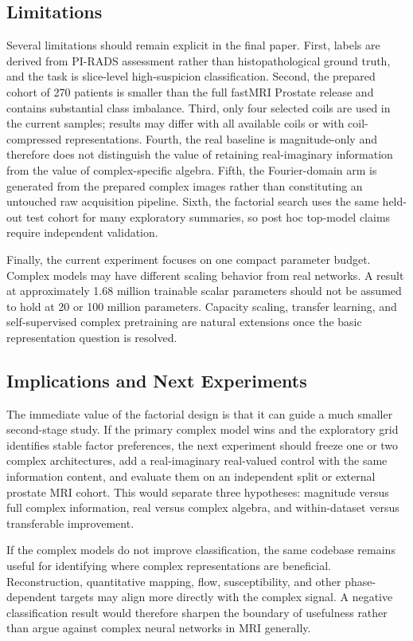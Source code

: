 \documentclass[journal]{IEEEtran}
\begin{document}
\subsection{Limitations}
Several limitations should remain explicit in the final paper. First, labels are derived from PI-RADS assessment rather than histopathological ground truth, and the task is slice-level high-suspicion classification. Second, the prepared cohort of 270 patients is smaller than the full fastMRI Prostate release and contains substantial class imbalance. Third, only four selected coils are used in the current samples; results may differ with all available coils or with coil-compressed representations. Fourth, the real baseline is magnitude-only and therefore does not distinguish the value of retaining real-imaginary information from the value of complex-specific algebra. Fifth, the Fourier-domain arm is generated from the prepared complex images rather than constituting an untouched raw acquisition pipeline. Sixth, the factorial search uses the same held-out test cohort for many exploratory summaries, so post hoc top-model claims require independent validation.

Finally, the current experiment focuses on one compact parameter budget. Complex models may have different scaling behavior from real networks. A result at approximately 1.68 million trainable scalar parameters should not be assumed to hold at 20 or 100 million parameters. Capacity scaling, transfer learning, and self-supervised complex pretraining are natural extensions once the basic representation question is resolved.

\subsection{Implications and Next Experiments}
The immediate value of the factorial design is that it can guide a much smaller second-stage study. If the primary complex model wins and the exploratory grid identifies stable factor preferences, the next experiment should freeze one or two complex architectures, add a real-imaginary real-valued control with the same information content, and evaluate them on an independent split or external prostate MRI cohort. This would separate three hypotheses: magnitude versus full complex information, real versus complex algebra, and within-dataset versus transferable improvement.

If the complex models do not improve classification, the same codebase remains useful for identifying where complex representations are beneficial. Reconstruction, quantitative mapping, flow, susceptibility, and other phase-dependent targets may align more directly with the complex signal. A negative classification result would therefore sharpen the boundary of usefulness rather than argue against complex neural networks in MRI generally.
\end{document}
